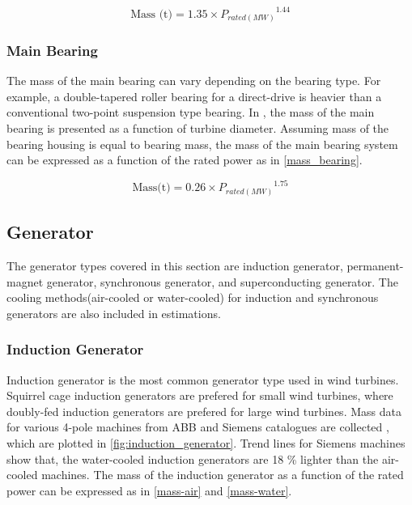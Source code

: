 \documentclass{article}\usepackage{graphicx, color}
\begin{document}
\begin{equation}
		\text{Mass (t)} = 1.35 \times {P_{rated(MW)}}^{1.44}
\end{equation}

\subsubsection{Main Bearing}

The mass of the main bearing can vary depending on the bearing type. For example, a double-tapered roller bearing for a direct-drive is heavier than a conventional two-point suspension type bearing. In  \cite{Fingersh2006}, the mass of the main bearing is presented as a function of turbine diameter. Assuming mass of the bearing housing is equal to bearing mass, the mass of the main bearing system can be expressed as a function of the rated power as in \autoref{mass_bearing}.

\begin{equation}
	\text{Mass(t)} = 0.26 \times {P_{rated(MW)}}^{1.75}
  \label{mass_bearing}
\end{equation}

\subsection{Generator}

The generator types covered in this section are induction generator, permanent-magnet generator, synchronous generator, and superconducting generator. The cooling methods(air-cooled or water-cooled) for induction and synchronous generators are also included in estimations. 

\subsubsection{Induction Generator}

Induction generator is the most common generator type used in wind turbines. Squirrel cage induction generators are prefered for small wind turbines, where doubly-fed induction generators are prefered for large wind turbines. Mass data for various 4-pole machines from ABB and Siemens catalogues are collected \cite{ABB2012a, Siemens}, which are plotted in \autoref{fig:induction_generator}. Trend lines for Siemens machines show that, the water-cooled induction generators are 18 \% lighter than the air-cooled machines. The mass of the induction generator as a function of the rated power can be expressed as in \autoref{mass-air} and \autoref{mass-water}.
\end{document}
